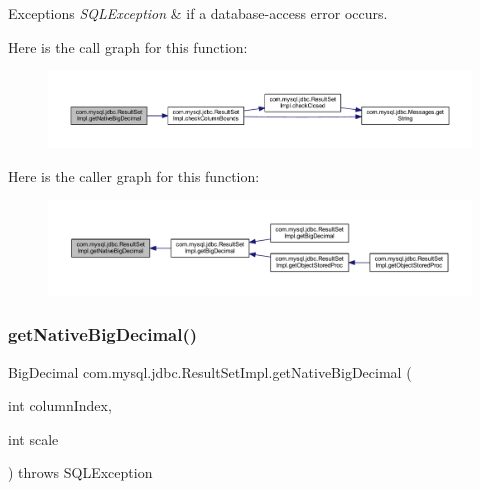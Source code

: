 \begin{DoxyExceptions}{Exceptions}
{\em S\+Q\+L\+Exception} & if a database-\/access error occurs. \\
\hline
\end{DoxyExceptions}
Here is the call graph for this function\+:
\nopagebreak
\begin{figure}[H]
\begin{center}
\leavevmode
\includegraphics[width=350pt]{classcom_1_1mysql_1_1jdbc_1_1_result_set_impl_a98fc4a067a058aa2732badb05b9eb4f4_cgraph}
\end{center}
\end{figure}
Here is the caller graph for this function\+:
\nopagebreak
\begin{figure}[H]
\begin{center}
\leavevmode
\includegraphics[width=350pt]{classcom_1_1mysql_1_1jdbc_1_1_result_set_impl_a98fc4a067a058aa2732badb05b9eb4f4_icgraph}
\end{center}
\end{figure}
\mbox{\label{classcom_1_1mysql_1_1jdbc_1_1_result_set_impl_a0a7e2392923b5db5870c053d91d42b29}} 
\subsubsection{\texorpdfstring{get\+Native\+Big\+Decimal()}{getNativeBigDecimal()}\hspace{0.1cm}{\footnotesize\ttfamily [2/2]}}
{\footnotesize\ttfamily Big\+Decimal com.\+mysql.\+jdbc.\+Result\+Set\+Impl.\+get\+Native\+Big\+Decimal (\begin{DoxyParamCaption}\item[{int}]{column\+Index,  }\item[{int}]{scale }\end{DoxyParamCaption}) throws S\+Q\+L\+Exception\hspace{0.3cm}{\ttfamily [protected]}}

